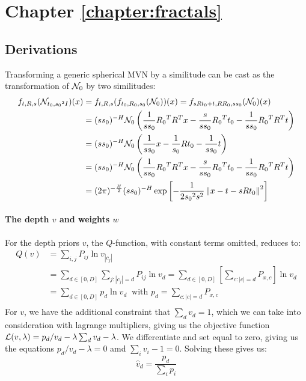 \section{Chapter \ref{chapter:fractals}}


\subsection{Derivations}

Transforming a generic spherical MVN by a similitude can be cast as the transformation of ${\cal N}_0$ by two similitudes:
\begin{align*}
f_{t, R, s}({\cal N}_{t_0, {s_0}^2 I})(x) &= f_{t, R, s}(f_{t_0, R_0, s_0}({\cal N}_0))(x) = f_{ sRt_0+t, RR_0,ss_0}({\cal N}_0)(x) \\
&= (ss_0)^{-H} {\cal N}_0\left(\frac{1}{ss_0} {R_0}^T R^T x - \frac{s}{ss_0} {R_0}^Tt_0 - \frac{1}{ss_0} {R_0}^TR^Tt \right) \\
&= (ss_0)^{-H} {\cal N}_0\left(\frac{1}{ss_0} x - \frac{1}{s_0} {R}t_0 - \frac{1}{ss_0} t \right) \\
&= (ss_0)^{-H} {\cal N}_0\left(\frac{1}{ss_0} {R_0}^T R^T x - \frac{s}{ss_0} {R_0}^Tt_0 - \frac{1}{ss_0} {R_0}^TR^Tt \right) \\
&=  (2\pi)^{-\frac{H}{2}} (ss_0)^{-H} \exp \left[- \frac{1}{2{s_0}^2s^2}\left\| x- t - s R t_0 \right \|^2\right]
\end{align*}

\paragraph{The depth $v$ and weights $w$} For the depth priors $v$, the $Q$-function, with constant terms omitted, reduces to:
\begin{align*}
Q(v) &= \sum_{i,j} P_{ij} \ln v_{|c_j|} \\ 
&= \sum_{d \in [0,D]} \sum_{j: |c_j| = d} P_{ij} \ln v_d = \sum_{d \in [0,D]} \left[\sum_{c: |c| = d} P_{x, c}\right] \ln v_d\\
&= \sum_{d \in [0,D]} p_d \ln v_d \;\;\text{with $p_d = \sum_{c: |c| = d} P_{x, c} $}  \\
\end{align*}
For $v$, we have the additional constraint that $\sum_d v_d = 1$, which we can take into consideration with lagrange multipliers, giving us the objective function ${\cal L}(v, \lambda) = p_d/v_d - \lambda\sum_d v_d - \lambda$. We differentiate and set equal to zero, giving us the equations $p_d/v_d - \lambda = 0$ amd $\sum_i v_i -1 =0$. Solving these gives us:
\[
\hat v_d = \frac{p_d}{\sum_i p_i}
\]

